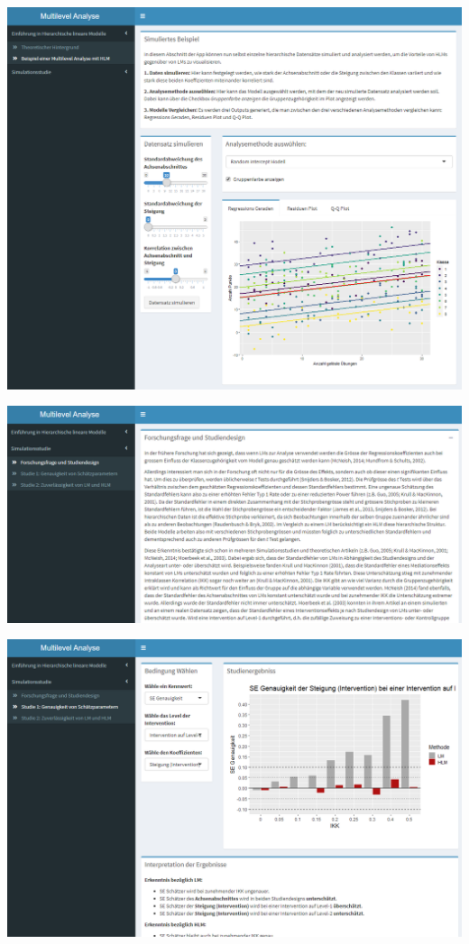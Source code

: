 \documentclass[12pt, a4paper]{article}\usepackage[]{graphicx}\usepackage[]{color}
\begin{document}
\begin{center}
\includegraphics[scale=0.5]{./figures/app_beispiel}
\end{center}

\begin{center}
\includegraphics[scale=0.5]{./figures/app_forschungsfrage}
\end{center}

\begin{center}
\includegraphics[scale=0.5]{./figures/app_study1}
\end{center}
\end{document}
